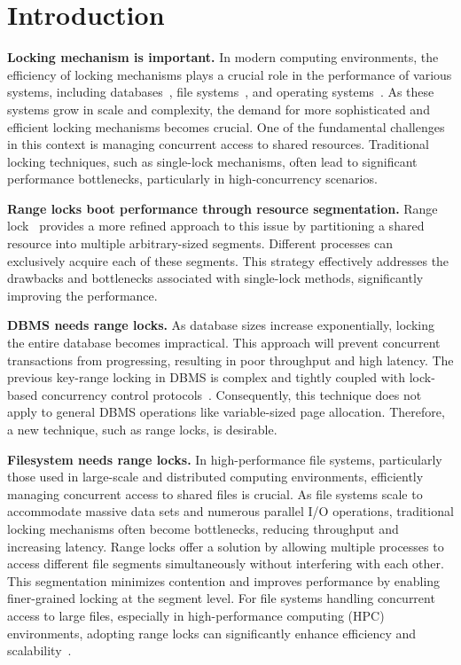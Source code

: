 \chapter{Introduction}\label{chapter:introduction}

\textbf{Locking mechanism is important.}
In modern computing environments, the efficiency of locking mechanisms plays a crucial role in the performance of various systems, including databases~\parencite{lomet1993key, graefe2007hierarchical}, file systems~\parencite{lee2021concurrent, gao2023citron, lee2019write}, and operating systems~\parencite{readerWriterLocks2017, mmapSem2017}. As these systems grow in scale and complexity, the demand for more sophisticated and efficient locking mechanisms becomes crucial. One of the fundamental challenges in this context is managing concurrent access to shared resources. Traditional locking techniques, such as single-lock mechanisms, often lead to significant performance bottlenecks, particularly in high-concurrency scenarios.

\textbf{Range locks boot performance through resource segmentation.} 
Range lock~\parencite{gao2023citron, kogan2020scalable} provides a more refined approach to this issue by partitioning a shared resource into multiple arbitrary-sized segments. Different processes can exclusively acquire each of these segments. This strategy effectively addresses the drawbacks and bottlenecks associated with single-lock methods, significantly improving the performance.

\textbf{DBMS needs range locks.}
As database sizes increase exponentially, locking the entire database becomes impractical. This approach will prevent concurrent transactions from progressing, resulting in poor throughput and high latency. The previous key-range locking in DBMS is complex and tightly coupled with lock-based concurrency control protocols~\parencite{graefe2007hierarchical, andy2022database}. 
Consequently, this technique does not apply to general DBMS operations like variable-sized page allocation. Therefore, a new technique, such as range locks, is desirable.

\textbf{Filesystem needs range locks.}
In high-performance file systems, particularly those used in large-scale and distributed computing environments, efficiently managing concurrent access to shared files is crucial. As file systems scale to accommodate massive data sets and numerous parallel I/O operations, traditional locking mechanisms often become bottlenecks, reducing throughput and increasing latency. Range locks offer a solution by allowing multiple processes to access different file segments simultaneously without interfering with each other. This segmentation minimizes contention and improves performance by enabling finer-grained locking at the segment level. For file systems handling concurrent access to large files, especially in high-performance computing (HPC) environments, adopting range locks can significantly enhance efficiency and scalability~\parencite{gao2023citron, lee2021concurrent}.

